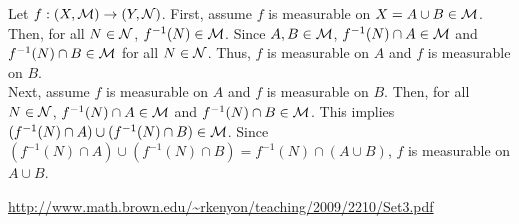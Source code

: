 \begin{enumerate}
\begin{pf}
Let $f: (X, {\mathcal M}) \rightarrow (Y, {\mathcal N})$.
	First, assume $f$ is measurable on $X=A \cup B\in {\mathcal M}$. Then, for all $N \in {\mathcal N}$, $f^{-1}(N) \in {\mathcal M}$. Since $A, B \in {\mathcal M}$, $f^{-1}(N) \cap A \in {\mathcal M}$ and $f^{-1}(N) \cap B \in {\mathcal M}$ for all $N \in {\mathcal N}$. Thus, $f$ is measurable on $A$ and $f$ is measurable on $B$.\\
	Next, assume $f$ is measurable on $A$ and $f$ is measurable on $B$. Then, for all $N \in {\mathcal N}$, $f^{-1}(N)\cap A \in {\mathcal M}$ and  $f^{-1}(N)\cap B \in {\mathcal M}$. This implies $(f^{-1}(N)\cap A) \cup (f^{-1}(N)\cap B) \in {\mathcal M}$. Since $(f^{-1}(N)\cap A) \cup (f^{-1}(N)\cap B)=f^{-1}(N) \cap (A \cup B)$, $f$ is measurable on $A \cup B$. 

\end{pf}
\url{http://www.math.brown.edu/~rkenyon/teaching/2009/2210/Set3.pdf} 


\end{enumerate}
